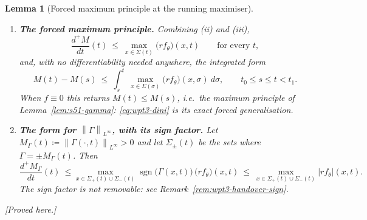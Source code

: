\documentclass[11pt]{article}
\newtheorem{lemma}[theorem]{Lemma}
\theoremstyle{definition}
\theoremstyle{remark}
\newcommand{\norm}[1]{\left\|#1\right\|}
\newcommand{\abs}[1]{\left|#1\right|}
\begin{document}
\begin{lemma}[Forced maximum principle at the running maximiser]
\begin{enumerate}[label=\textup{(\roman*)},leftmargin=2.6em]
      \begin{equation}\label{eq:wpt3-danskin}
        \frac{d^{+}M}{dt}(t)=\max_{x\in\Sigma(t)}\partial_t\Gamma(x,t),
        \qquad
        \frac{d^{-}M}{dt}(t)=\min_{x\in\Sigma(t)}\partial_t\Gamma(x,t).
      \end{equation}
      Hence $M$ is differentiable at $t$ precisely when these agree, and (by
      Rademacher) at almost every $t$.
    \item \textbf{The forced maximum principle.} Combining (ii) and (iii),
      \begin{equation}\label{eq:wpt3-dini}
        \frac{d^{+}M}{dt}(t)\ \leq\ \max_{x\in\Sigma(t)}
          \bigl(rf_\theta\bigr)(x,t)\qquad\text{for every }t,
      \end{equation}
      and, with no differentiability needed anywhere, the integrated form
      \begin{equation}\label{eq:wpt3-integral}
        M(t)-M(s)\ \leq\ \int_s^t\ \max_{x\in\Sigma(\sigma)}
          \bigl(rf_\theta\bigr)(x,\sigma)\ d\sigma ,
        \qquad t_0\leq s\leq t<t_1 .
      \end{equation}
      When $f\equiv0$ this returns $M(t)\leq M(s)$, i.e.\ the maximum
      principle of Lemma~\ref{lem:s51-gamma}: \eqref{eq:wpt3-dini} is its
      exact forced generalisation.
    \item \textbf{The form for $\norm{\Gamma}_{L^\infty}$, with its sign
      factor.} Let
      $M_\Gamma(t)\coloneqq\norm{\Gamma(\cdot,t)}_{L^\infty}>0$ and let
      $\Sigma_\pm(t)$ be the sets where $\Gamma=\pm M_\Gamma(t)$. Then
      \begin{equation}\label{eq:wpt3-signed}
        \frac{d^{+}M_\Gamma}{dt}(t)\ \leq
        \max_{x\in\Sigma_+(t)\cup\Sigma_-(t)}
          \operatorname{sgn}\bigl(\Gamma(x,t)\bigr)\,
          \bigl(rf_\theta\bigr)(x,t)
        \ \leq\ \max_{x\in\Sigma_+(t)\cup\Sigma_-(t)}
          \abs{rf_\theta}(x,t).
      \end{equation}
      The sign factor is \emph{not} removable: see
      Remark~\ref{rem:wpt3-handover-sign}.
  \end{enumerate}
  \emph{[Proved here.]}
\end{lemma}
\end{document}
